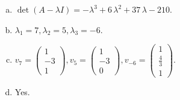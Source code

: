 \begin{questions}
\begin{solution}
\begin{enumerate}[(a)]
\item $\det(A-\lambda I)=-{\lambda}^{3} + 6 \, {\lambda}^{2} + 37 \, {\lambda} - 210$.
\item ${\lambda}_1=7, {\lambda}_2=5, {\lambda}_3=-6$.
\item $v_{7}=\left(\begin{array}{r}
1 \\
-3 \\
1
\end{array}\right), v_{5}=\left(\begin{array}{r}
1 \\
-3 \\
0
\end{array}\right), v_{-6}=\left(\begin{array}{r}
1 \\
\frac{4}{3} \\
1
\end{array}\right)$.
\item Yes.
\end{enumerate}
\end{solution}

\end{questions}

\newpage


\begin{center}
\end{center}

